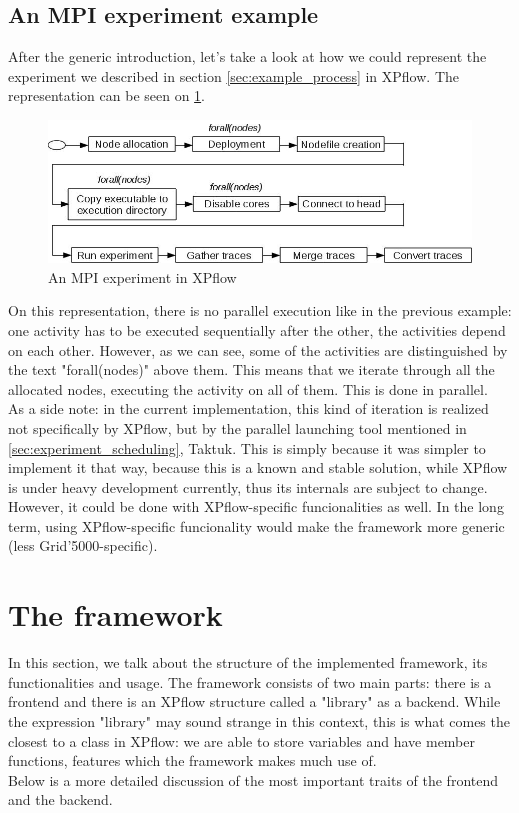 \subsection{An MPI experiment example}
After the generic introduction, let's take a look at how we could
represent the experiment we described in section
\ref{sec:example_process} in XPflow. The representation can be seen on
\ref{fig:xpflow_example2}.
\begin{figure}[htbp]
  \centering
    \includegraphics[scale=0.5]{./Figures/xpflow_example2.jpg}
  \caption[dayum]{An MPI experiment in XPflow}
  \label{fig:xpflow_example2}
\end{figure}
On this representation, there is no parallel execution like in the
previous example: one activity has to be executed sequentially after
the other, the activities depend on each other. However, as we can
see, some of the activities are distinguished by the text
"forall(nodes)" above them. This means that we iterate through all the
allocated nodes, executing the activity on all of them. This is done
in parallel.\\
As a side note: in the current implementation, this kind of iteration
is realized not
specifically by XPflow, but by the parallel launching tool mentioned
in \ref{sec:experiment_scheduling}, Taktuk\cite{chr09}. This is simply
because it was simpler to implement it that way, because this is a
known and stable solution, while XPflow is under heavy development
currently, thus its internals are subject to change. However, it could
be done with XPflow-specific funcionalities as well. In the long term,
using XPflow-specific funcionality would make the framework more
generic (less Grid'5000-specific).
\section{The framework}
In this section, we talk about the structure of the implemented
framework, its functionalities and usage.
The framework consists of two main parts: there is a frontend and
there is an XPflow structure called a "library" as a backend. While
the expression "library" may sound strange in this context, this is
what comes the closest to a class in XPflow: we are able to store
variables and have member functions, features which the framework
makes much use of.\\
Below is a more detailed discussion of the most important traits of
the frontend and the backend.
